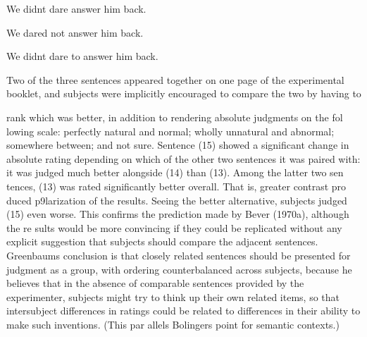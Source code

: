 \begin{listWWNumxxviiileveli}
\item 
\begin{styleStandard}
We didn{\textquotesingle}t dare answer him back.
\end{styleStandard}


\item 
\begin{styleStandard}
We dared not answer him back.
\end{styleStandard}


\item 
\begin{styleStandard}
We didn{\textquotesingle}t dare to answer him back.
\end{styleStandard}


\end{listWWNumxxviiileveli}
\begin{styleStandard}
Two of the three sentences appeared together on one page of the experimental booklet, and subjects were implicitly encouraged to compare the two by having to
\end{styleStandard}


\clearpage\setcounter{page}{1}\begin{styleTextbody}
rank which was better, in addition to rendering absolute judgments on the fol\- lowing scale: {\textquotedbl}perfectly natural and normal{\textquotedbl}; {\textquotedbl}wholly unnatural and abnormal{\textquotedbl}; {\textquotedbl}somewhere between{\textquotedbl}; and {\textquotedbl}not sure.{\textquotedbl} Sentence (15) showed a significant change in absolute rating depending on which of the other two sentences it was paired with: it was judged much better alongside (14) than (13). Among the latter two sen\- tences, (13) was rated significantly better overall. That is, greater contrast pro duced p9larization of the results. Seeing the better alternative, subjects judged (15) even worse. This confirms the prediction made by Bever (1970a), although the re\- sults would be more convincing if they could be replicated without any explicit suggestion that subjects should compare the adjacent sentences. Greenbaum{\textquotesingle}s conclusion is that closely related sentences should be presented for judgment as a group, with ordering counterbalanced across subjects, because he believes that in the absence of comparable sentences provided by the experimenter, subjects might try to think up their own related items, so that intersubject differences in ratings could be related to differences in their ability to make such inventions. (This par\- allels Bolinger{\textquotesingle}s point for semantic contexts.)
\end{styleTextbody}


